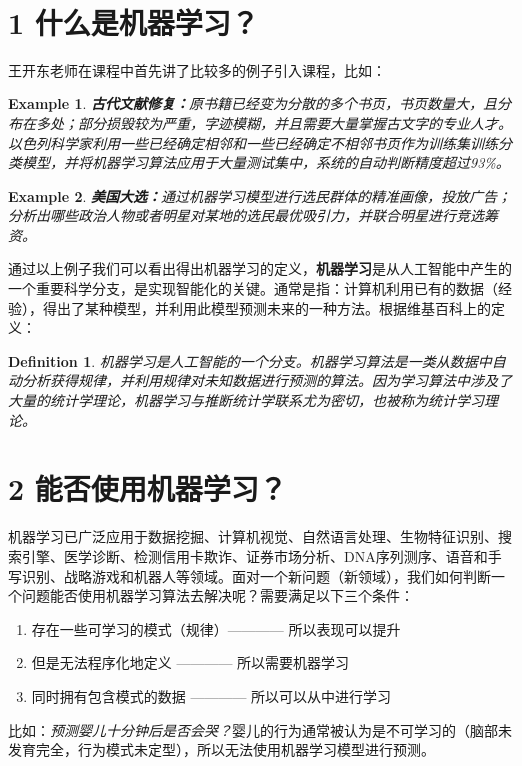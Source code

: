 \documentclass[twoside]{article}
\newtheorem{example}{Example}
\newtheorem{definition}{Definition}
\begin{document}
 \vspace{2mm} \\
\section*{1  什么是机器学习？}

    王开东老师在课程中首先讲了比较多的例子引入课程，比如：
\begin{example}
    \textbf{古代文献修复：}原书籍已经变为分散的多个书页，书页数量大，且分布在多处；部分损毁较为严重，字迹模糊，并且需要大量掌握古文字的专业人才。以色列科学家利用一些已经确定相邻和一些已经确定不相邻书页作为训练集训练分类模型，并将机器学习算法应用于大量测试集中，系统的自动判断精度超过93\%。
\end{example}
    
\begin{example}
    \textbf{美国大选：}通过机器学习模型进行选民群体的精准画像，投放广告；分析出哪些政治人物或者明星对某地的选民最优吸引力，并联合明星进行竞选筹资。
\end{example}
通过以上例子我们可以看出得出机器学习的定义，\textbf{机器学习}是从人工智能中产生的一个重要科学分支，是实现智能化的关键。通常是指：计算机利用已有的数据（经验），得出了某种模型，并利用此模型预测未来的一种方法。根据维基百科上的定义：
\begin{definition}
    机器学习是人工智能的一个分支。机器学习算法是一类从数据中自动分析获得规律，并利用规律对未知数据进行预测的算法。因为学习算法中涉及了大量的统计学理论，机器学习与推断统计学联系尤为密切，也被称为统计学习理论。
\end{definition}
\section*{2  能否使用机器学习？}
机器学习已广泛应用于数据挖掘、计算机视觉、自然语言处理、生物特征识别、搜索引擎、医学诊断、检测信用卡欺诈、证券市场分析、DNA序列测序、语音和手写识别、战略游戏和机器人等领域。面对一个新问题（新领域），我们如何判断一个问题能否使用机器学习算法去解决呢？需要满足以下三个条件：
\begin{enumerate}
    \item 存在一些可学习的模式（规律）———— 所以表现可以提升
    \item 但是无法程序化地定义 ———— 所以需要机器学习
    \item 同时拥有包含模式的数据 ———— 所以可以从中进行学习 
\end{enumerate}
比如：\textit{预测婴儿十分钟后是否会哭？}婴儿的行为通常被认为是不可学习的（脑部未发育完全，行为模式未定型），所以无法使用机器学习模型进行预测。
\end{document}
